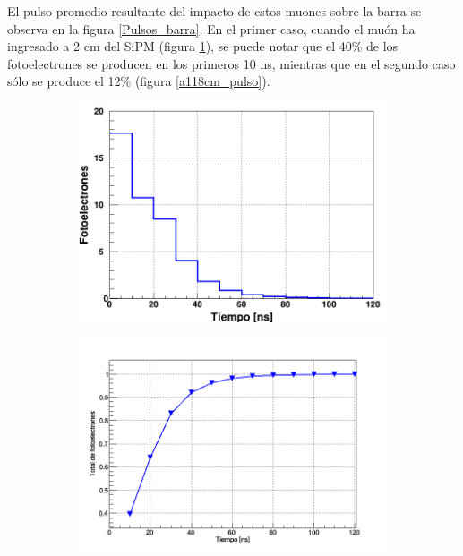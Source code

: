 \documentclass[12pt,oneside,openany,letter]{book}
\begin{document}
El pulso promedio resultante del impacto de estos muones sobre la barra se observa en la figura \ref{Pulsos_barra}. En el primer caso, cuando el mu\'on ha ingresado a 2 cm del SiPM (figura \ref{a2cm_pulso}), se puede notar que el 40\% de los fotoelectrones se producen en los primeros 10 ns, mientras que en el segundo caso s\'olo se produce el 12\% (figura \ref{a118cm_pulso}).  
\begin{figure}[h!]
    \centering
    \begin{subfigure}{0.44\textwidth}
        \includegraphics[width=\textwidth]{a2cm_pulso.png}
        \caption{}
        \label{a2cm_pulso}
    \end{subfigure}
    \begin{subfigure}{0.5\textwidth}
        \includegraphics[width=\textwidth]{2cmcum.png}
        \caption{}
        \label{2cmcum}

\end{subfigure}
\end{figure}
\end{document}
